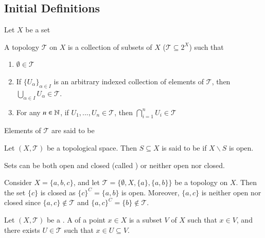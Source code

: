 \documentclass[12pt, a4paper, oneside, openright, titlepage]{book}
\begin{document}
\subsection{Initial Definitions}

Let $X$ be a set

\begin{defn}
    A topology $\mathcal{T}$ on $X$ is a collection of subsets of $X$ ($\mathcal{T} \subseteq 2^X$) such that \begin{enumerate}
        \item $\emptyset \in \mathcal{T}$
        \item If $\{U_{\alpha}\}_{\alpha \in I}$ is an arbitrary indexed collection of elements of $\mathcal{T}$, then $\bigcup_{\alpha \in I}U_\alpha \in \mathcal{T}$.
        \item For any $n \in \mathbb N$, if $U_1,...,U_n \in \mathcal{T}$, then $\bigcap\limits_{i=1}^nU_i \in \mathcal{T}$
    \end{enumerate}
    Elements of $\mathcal{T}$ are said to be 
\end{defn}

\begin{rmk}
    Let $(X,\mathcal{T})$ be a topological space. Then $S\subseteq X$ is said to be  if $X\backslash S$ is open. 
\end{rmk}

\begin{cust}[Fact]
    Sets can be both open and closed (called ) or neither open nor closed.
\end{cust}

\begin{eg}
    Consider $X = \{a,b,c\}$, and let $\mathcal{T} = \{\emptyset, X, \{a\}, \{a,b\}\}$ be a topology on $X$. Then the set $\{c\}$ is closed as $\{c\}^C = \{a,b\}$ is open. Moreover, $\{a,c\}$ is neither open nor closed since $\{a,c\} \notin \mathcal{T}$ and $\{a,c\}^C = \{b\} \notin \mathcal{T}$.
\end{eg}


\begin{defn}
    Let $(X,\mathcal{T})$ be a . A  of a point $x \in X$ is a subset $V$ of $X$ such that $x \in V$, and there exists $U \in \mathcal{T}$ such that $x \in U \subseteq V$. 
\end{defn}
\end{document}
